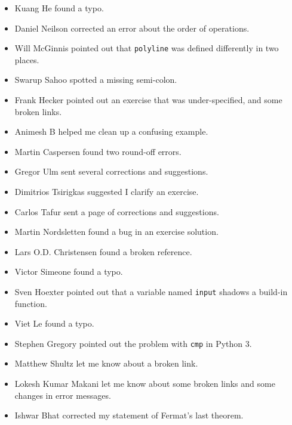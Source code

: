 \documentclass[10pt]{book}
\begin{document}
\begin{itemize}
\item Kuang He found a typo.

\item Daniel Neilson corrected an error about the order of operations.

\item Will McGinnis pointed out that {\tt polyline} was defined
differently in two places.

\item Swarup Sahoo spotted a missing semi-colon.

\item Frank Hecker pointed out an exercise that was under-specified, and
some broken links.

\item Animesh B helped me clean up a confusing example.

\item Martin Caspersen found two round-off errors.

\item Gregor Ulm sent several corrections and suggestions.

\item Dimitrios Tsirigkas suggested I clarify an exercise.

\item Carlos Tafur sent a page of corrections and suggestions.

\item Martin Nordsletten found a bug in an exercise solution.

\item Lars O.D. Christensen found a broken reference.

\item Victor Simeone found a typo.

\item Sven Hoexter pointed out that a variable named {\tt input}
shadows a build-in function.

\item Viet Le found a typo.

\item Stephen Gregory pointed out the problem with {\tt cmp}
in Python 3.

\item Matthew Shultz let me know about a broken link.

\item Lokesh Kumar Makani let me know about some broken links and some
changes in error messages.

\item Ishwar Bhat corrected my statement of Fermat's last theorem.


\end{itemize}
\end{document}
